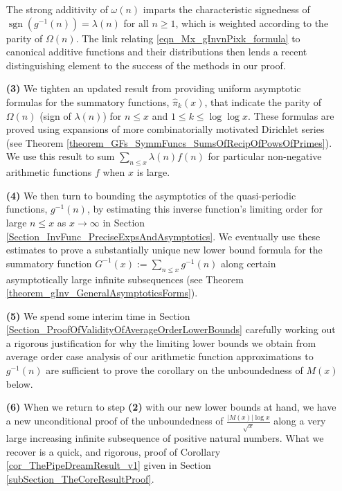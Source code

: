 \documentclass[11pt,reqno,a4letter]{article}
\numberwithin{figure}{section}
\numberwithin{table}{section}
\theoremstyle{plain}
\numberwithin{theorem}{section}
\theoremstyle{definition}
\begin{document}
\begin{itemize}
           The strong additivity of $\omega(n)$ imparts the characteristic signedness of 
           $\operatorname{sgn}(g^{-1}(n)) = \lambda(n)$ for all $n \geq 1$, which is weighted 
           according to the parity of $\Omega(n)$. 
           The link relating \eqref{eqn_Mx_gInvnPixk_formula} to canonical additive functions and their 
           distributions then lends a recent distinguishing element to the 
           success of the methods in our proof. 
\item[\textbf{(3)}] We tighten an updated result from \cite[\S 7]{MV} providing uniform asymptotic formulas for the  
           summatory functions, $\widehat{\pi}_k(x)$, that indicate the parity of 
           $\Omega(n)$ (sign of $\lambda(n)$) 
           for $n \leq x$ and $1 \leq k \leq \log\log x$. These formulas are proved using expansions of 
           more combinatorially motivated Dirichlet series 
           (see Theorem \ref{theorem_GFs_SymmFuncs_SumsOfRecipOfPowsOfPrimes}). 
           We use this result to sum $\sum_{n \leq x} \lambda(n) f(n)$ for particular non-negative arithmetic 
           functions $f$ when $x$ is large. 
\item[\textbf{(4)}] We then turn to bounding the 
           asymptotics of the quasi-periodic functions, $g^{-1}(n)$, by estimating this inverse function's 
           limiting order for large $n \leq x$ as $x \rightarrow \infty$ in 
           Section \ref{Section_InvFunc_PreciseExpsAndAsymptotics}. 
           We eventually use these estimates to prove a substantially unique new lower bound formula 
           for the summatory function $G^{-1}(x) := \sum_{n \leq x} g^{-1}(n)$ along certain asymptotically large 
           infinite subsequences (see Theorem \ref{theorem_gInv_GeneralAsymptoticsForms}). 
\item[\textbf{(5)}] We spend some interim time in Section \ref{Section_ProofOfValidityOfAverageOrderLowerBounds} 
           carefully working out a rigorous justification for why the limiting lower bounds we obtain from average 
           order case analysis of our arithmetic function approximations 
           to $g^{-1}(n)$ are sufficient to prove the corollary on the unboundedness of $M(x)$ below. 
\item[\textbf{(6)}] When we return to step \textbf{(2)} 
           with our new lower bounds at hand, we have a new unconditional proof of the 
           unboundedness of $\frac{|M(x)| \log x}{\sqrt{x}}$ 
           along a very large increasing infinite subsequence 
           of positive natural numbers. What we recover is a quick, and rigorous, proof of 
           Corollary \ref{cor_ThePipeDreamResult_v1} given in 
           Section \ref{subSection_TheCoreResultProof}. 
           
\end{itemize} 
\end{document}
